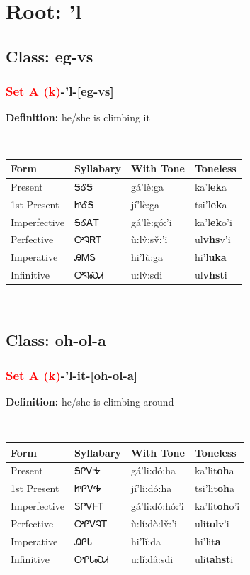 \needspace{4in}
\section*{Root: 'l}
\nopagebreak
{}
\needspace{3in}
\subsection*{Class: eg-vs}
\nopagebreak
\needspace{2in}
\subsubsection*{\textcolor{Red}{Set A (k)}{-}\textbf{'l}{-}[eg-vs]}
\nopagebreak
\textbf{Definition: } he/she is climbing it
\\[0.5em]
\begin{tabularx}{\textwidth}{l X X X}%
\toprule%
\textbf{Form}&\textbf{Syllabary}&\textbf{With Tone}&\textbf{Toneless}\\%
\midrule%
Present&ᎦᎴᎦ&gá’lè:ga&ka'l\textbf{ek}a\\%
1st Present&ᏥᎴᎦ&jí’lè:ga&tsi'l\textbf{ek}a\\%
Imperfective&ᎦᎴᎪᎢ&gá’lè:gó:’i&ka'l\textbf{ek}o'i\\%
Perfective&ᎤᎸᏒᎢ&ù:lv̂:sv̌:’i&ul\textbf{vhs}v'i\\%
Imperative&ᎯᎷᎦ&hi’lù:ga&hi'l\textbf{uka}\\%
Infinitive&ᎤᎸᏍᏗ&u:lv̀:sdi&ul\textbf{vhst}i\\%
\bottomrule%
\end{tabularx}
\\[1em]
\needspace{3in}
\subsection*{Class: oh-ol-a}
\nopagebreak
\needspace{2in}
\subsubsection*{\textcolor{Red}{Set A (k)}{-}\textbf{'l}{-}it{-}[oh-ol-a]}
\nopagebreak
\textbf{Definition: } he/she is climbing around
\\[0.5em]
\begin{tabularx}{\textwidth}{l X X X}%
\toprule%
\textbf{Form}&\textbf{Syllabary}&\textbf{With Tone}&\textbf{Toneless}\\%
\midrule%
Present&ᎦᎵᏙᎭ&gá’li:dó:ha&ka'lit\textbf{oh}a\\%
1st Present&ᏥᎵᏙᎭ&jí’li:dó:ha&tsi'lit\textbf{oh}a\\%
Imperfective&ᎦᎵᏙᎰᎢ&gá’li:dó:hó:’i&ka'lit\textbf{oh}o'i\\%
Perfective&ᎤᎵᏙᎸᎢ&ù:lí:dò:lv̌:’i&ulit\textbf{ol}v'i\\%
Imperative&ᎯᎵᏓ&hi’lǐ:da&hi'lit\textbf{a}\\%
Infinitive&ᎤᎵᏓᏍᏗ&u:lǐ:dâ:sdi&ulit\textbf{ahst}i\\%
\bottomrule%
\end{tabularx}
\\[1em]